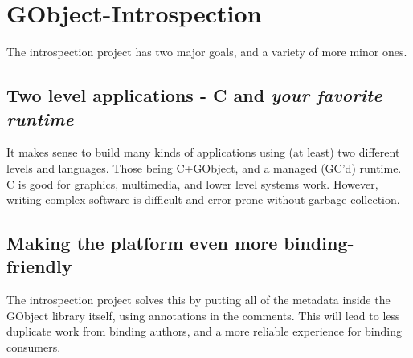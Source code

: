 
\section[GObject-Introspection]{GObject-Introspection\cite{website:introspection}}\label{sec:g-i}

The introspection project has two major goals, and a variety of more minor ones.

\subsection{Two level applications - C and \emph{your favorite runtime}}

It makes sense to build many kinds of applications using (at least) two different levels and languages. Those being C+GObject, and a managed (GC'd) runtime. C is good for graphics, multimedia, and lower level systems work. However, writing complex software is difficult and error-prone without garbage collection.

\subsection{Making the platform even more binding-friendly}

The introspection project solves this by putting all of the metadata inside the GObject library itself, using annotations in the comments. This will lead to less duplicate work from binding authors, and a more reliable experience for binding consumers.
